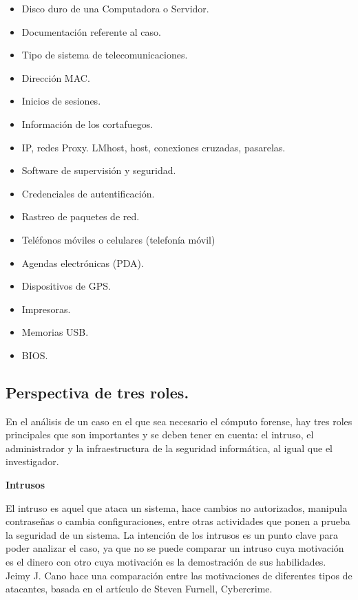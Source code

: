 \begin{itemize}
    \item Disco duro de una Computadora o Servidor.
    \item Documentación referente al caso.
    \item Tipo de sistema de telecomunicaciones.
    \item Dirección MAC.
    \item Inicios de sesiones.
    \item Información de los cortafuegos.
    \item IP, redes Proxy. LMhost, host, conexiones cruzadas, pasarelas.
    \item Software de supervisión y seguridad.
    \item Credenciales de autentificación.
    \item Rastreo de paquetes de red.
    \item Teléfonos móviles o celulares (telefonía móvil)
    \item Agendas electrónicas (PDA).
    \item Dispositivos de GPS.
    \item Impresoras.
    \item Memorias USB.
    \item BIOS.
\end{itemize}

\subsection{Perspectiva de tres roles.}

En el análisis de un caso en el que sea necesario el cómputo forense, hay tres roles principales que son importantes y se deben tener en cuenta: el intruso, el administrador y la infraestructura de la seguridad informática, al igual que el investigador.

\textbf{Intrusos}

El intruso es aquel que ataca un sistema, hace cambios no autorizados, manipula contraseñas o cambia configuraciones, entre otras actividades que ponen a prueba la seguridad de un sistema. La intención de los intrusos es un punto clave para poder analizar el caso, ya que no se puede comparar un intruso cuya motivación es el dinero con otro cuya motivación es la demostración de sus habilidades. Jeimy J. Cano hace una comparación entre las motivaciones de diferentes tipos de atacantes, basada en el artículo de Steven Furnell, Cybercrime.


